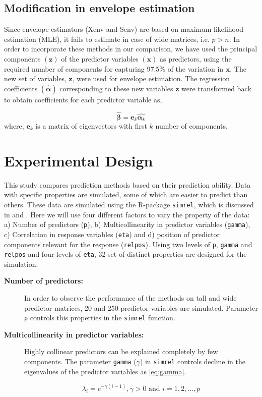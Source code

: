 \documentclass[12pt,3p,authoryear]{elsarticle}
\begin{document}
\subsection{Modification in envelope
estimation}\label{modification-in-envelope-estimation}

Since envelope estimators (Xenv and Senv) are based on maximum
likelihood estimation (MLE), it fails to estimate in case of wide
matrices, i.e. \(p > n\). In order to incorporate these methods in our
comparison, we have used the principal components \((\mathbf{z})\) of
the predictor variables \((\mathbf{x})\) as predictors, using the
required number of components for capturing 97.5\% of the variation in
\(\mathbf{x}\). The new set of variables, \(\mathbf{z}\), were used for
envelope estimation. The regression coefficients
\((\hat{\boldsymbol{\alpha}})\) corresponding to these new variables
\(\mathbf{z}\) were transformed back to obtain coefficients for each
predictor variable as,

\[\hat{\boldsymbol{\beta}} = \mathbf{e}_k\hat{\boldsymbol{\alpha}_k}\]
where, \(\mathbf{e}_k\) is a matrix of eigenvectors with first \(k\)
number of components.

\hypertarget{experimental-design}{\section{Experimental
Design}\label{experimental-design}}

This study compares prediction methods based on their prediction
ability. Data with specific properties are simulated, some of which are
easier to predict than others. These data are simulated using the
R-package \texttt{simrel}, which is discussed in \citet{saebo2015simrel}
and \citet{Rimal2018}. Here we will use four different factors to vary
the property of the data: a) Number of predictors (\texttt{p}), b)
Multicollinearity in predictor variables (\texttt{gamma}), c)
Correlation in response variables (\texttt{eta}) and d) position of
predictor components relevant for the response (\texttt{relpos}). Using
two levels of \texttt{p}, \texttt{gamma} and \texttt{relpos} and four
levels of \texttt{eta}, 32 set of distinct properties are designed for
the simulation.

\begin{description}
\item[\textbf{Number of predictors:}]
In order to observe the performance of the methods on tall and wide
predictor matrices, 20 and 250 predictor variables are simulated.
Parameter \texttt{p} controls this properties in the \texttt{simrel}
function.
\item[\textbf{Multicollinearity in predictor variables:}]
Highly collinear predictors can be explained completely by few
components. The parameter \texttt{gamma} (\(\gamma\)) in \texttt{simrel}
controls decline in the eigenvalues of the predictor variables as
\eqref{eq:gamma}.

\begin{equation}
  \lambda_i = e^{-\gamma(i - 1)}, \gamma > 0 \text{ and } i = 1, 2, \ldots, p
  \label{eq:gamma}
\end{equation}
\end{description}
\end{document}
